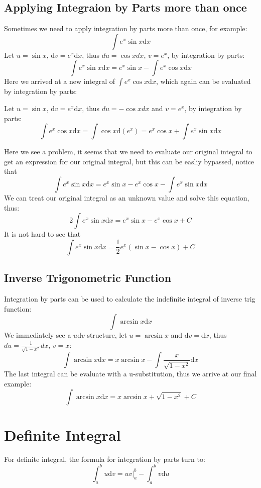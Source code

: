 \documentclass{article}
\numberwithin{equation}{section}
\begin{document}
\newpage
\subsection{Applying Integraion by Parts more than once}
Sometimes we need to apply integration by parts more than once, for example:
\[
\int e^x \sin x \mathrm{d}x
\]
Let $u = \sin x$, $\mathrm{d}v = e^x \mathrm{d}x$, thus $du = \cos x dx$, $v = e^x$, by integration by parts:
\[
\int e^x \sin x \mathrm{d}x = e^x \sin x - \int e^x \cos x \mathrm{d}x
\]
Here we arrived at a new integral of $\int e^x \cos x \mathrm{d}x$, which again can be evaluated by integration by parts:

Let $u = \sin x$, $\mathrm{d}v = e^x \mathrm{d}x$, thus $du = -\cos x dx$ and $v = e^x$, by integration by parts:
\[
\int e^x \cos x \mathrm{d}x = \int \cos x \mathrm{d}(e^x) = e^x \cos x + \int e^x \sin x \mathrm{d}x
\]

Here we see a problem, it seems that we need to evaluate our original integral to get an expression for our original integral, but this can be easliy bypassed,
notice that
\[
\int e^x \sin x \mathrm{d}x = e^x \sin x - e^x \cos x - \int e^x \sin x \mathrm{d}x
\]
We can treat our original integral as an unknown value and solve this equation, thus:
\[
2 \int e^x \sin x \mathrm{d}x = e^x \sin x - e^x \cos x + C
\]
It is not hard to see that
\[
\int e^x \sin x \mathrm{d}x = \frac{1}{2}e^x (\sin x - \cos x) + C
\]

\subsection{Inverse Trigonometric Function}
Integration by parts can be used to calculate the indefinite integral of inverse trig function:
\[
\int \arcsin x \mathrm{d}x
\]
We immediately see a $u\mathrm{d}v$ structure, let $u=\arcsin x$ and $\mathrm{d}v = \mathrm{d}x$, thus $du = \frac{1}{\sqrt{1-x^2}} dx$, $v = x$:
\[
\int \arcsin x \mathrm{d}x = x\arcsin x - \int \frac{x}{\sqrt{1-x^2}} \mathrm{d}x
\]
The last integral can be evaluate with a u-substitution, thus we arrive at our final example:
\[
\int \arcsin x \mathrm{d}x = x\arcsin x + \sqrt{1-x^2} + C
\]

\newpage
\section{Definite Integral}
For definite integral, the formula for integration by parts turn to:
\[
\int_{a}^{b} u\mathrm{d}v = uv \Big|_a^b - \int_{a}^{b} v\mathrm{d}u
\]
\end{document}
